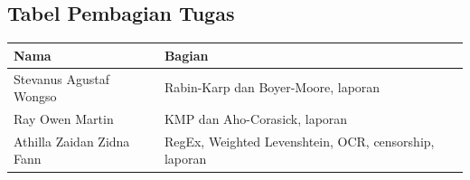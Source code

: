 \subsection{Tabel Pembagian Tugas}
\begin{table}[H]
    \centering
    \renewcommand{\arraystretch}{1.5}
    \begin{tabular}{|p{5cm}|p{8cm}|}
        \hline
        Nama & Bagian \\
        \hline
        Stevanus Agustaf Wongso & Rabin-Karp dan Boyer-Moore, laporan \\
        \hline
        Ray Owen Martin & KMP dan Aho-Corasick, laporan \\
        \hline
        Athilla Zaidan Zidna Fann & RegEx, Weighted Levenshtein, OCR, censorship, laporan \\
        \hline
    \end{tabular}
\end{table}

